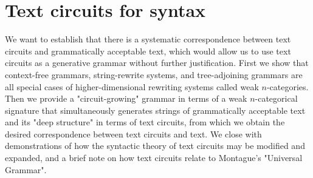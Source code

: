 



\maketitle%

\tableofcontents{}

\chapter{Text circuits for syntax}\label{chapter:textcircuits}
We want to establish that there is a systematic correspondence between text circuits and grammatically acceptable text, which would allow us to use text circuits as a generative grammar without further justification. First we show that context-free grammars, string-rewrite systems, and tree-adjoining grammars are all special cases of higher-dimensional rewriting systems called weak $n$-categories. Then we provide a "circuit-growing" grammar in terms of a weak $n$-categorical signature that simultaneously generates strings of grammatically acceptable text and its "deep structure" in terms of text circuits, from which we obtain the desired correspondence between text circuits and text. We close with demonstrations of how the syntactic theory of text circuits may be modified and expanded, and a brief note on how text circuits relate to Montague's "Universal Grammar".
\label{sec:ncat}
\newpage

\newpage

%





